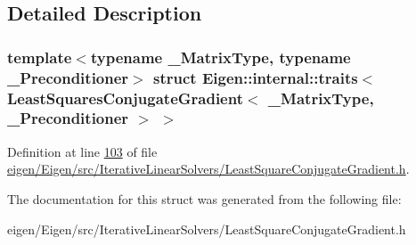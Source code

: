 \subsection{Detailed Description}
\subsubsection*{template$<$typename \+\_\+\+Matrix\+Type, typename \+\_\+\+Preconditioner$>$\newline
struct Eigen\+::internal\+::traits$<$ Least\+Squares\+Conjugate\+Gradient$<$ \+\_\+\+Matrix\+Type, \+\_\+\+Preconditioner $>$ $>$}



Definition at line \hyperlink{eigen_2_eigen_2src_2_iterative_linear_solvers_2_least_square_conjugate_gradient_8h_source_l00103}{103} of file \hyperlink{eigen_2_eigen_2src_2_iterative_linear_solvers_2_least_square_conjugate_gradient_8h_source}{eigen/\+Eigen/src/\+Iterative\+Linear\+Solvers/\+Least\+Square\+Conjugate\+Gradient.\+h}.



The documentation for this struct was generated from the following file\+:\begin{DoxyCompactItemize}
\item 
eigen/\+Eigen/src/\+Iterative\+Linear\+Solvers/\+Least\+Square\+Conjugate\+Gradient.\+h\end{DoxyCompactItemize}

